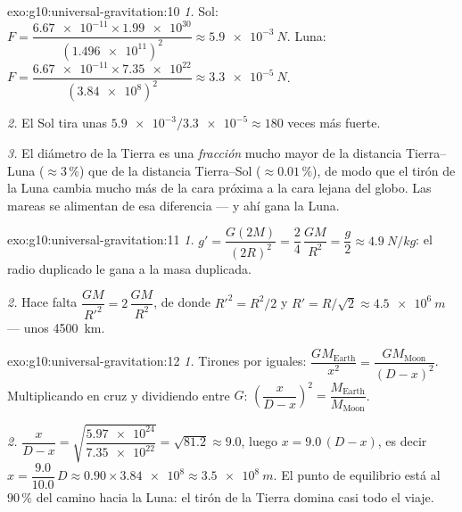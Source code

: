 \begin{solution}{exo:g10:universal-gravitation:10}
\emph{1.} Sol:
$F = \dfrac{\num{6.67e-11} \times \num{1.99e30}}{(\num{1.496e11})^2}
\approx \qty{5.9e-3}{N}$. Luna:
$F = \dfrac{\num{6.67e-11} \times \num{7.35e22}}{(\num{3.84e8})^2}
\approx \qty{3.3e-5}{N}$.

\emph{2.} El Sol tira unas $\num{5.9e-3}/\num{3.3e-5} \approx 180$ veces
más fuerte.

\emph{3.} El diámetro de la Tierra es una \emph{fracción} mucho mayor de
la distancia Tierra--Luna ($\approx 3\,\%$) que de la distancia
Tierra--Sol ($\approx 0.01\,\%$), de modo que el tirón de la Luna cambia
mucho más de la cara próxima a la cara lejana del globo. Las mareas se
alimentan de esa diferencia --- y ahí gana la Luna.
\end{solution}

\begin{solution}{exo:g10:universal-gravitation:11}
\emph{1.} $g' = \dfrac{G (2M)}{(2R)^2} = \dfrac{2}{4}\,\dfrac{GM}{R^2}
= \dfrac{g}{2} \approx \qty{4.9}{N/kg}$: el radio duplicado le gana a la
masa duplicada.

\emph{2.} Hace falta $\dfrac{GM}{R'^2} = 2\,\dfrac{GM}{R^2}$, de donde
$R'^2 = R^2/2$ y $R' = R/\sqrt{2} \approx \qty{4.5e6}{m}$ --- unos
\qty{4500}{km}.
\end{solution}

\begin{solution}{exo:g10:universal-gravitation:12}
\emph{1.} Tirones por  iguales:
$\dfrac{G M_{\text{Earth}}}{x^2} = \dfrac{G M_{\text{Moon}}}{(D-x)^2}$.
Multiplicando en cruz y dividiendo entre $G$:
$\left(\dfrac{x}{D-x}\right)^2 = \dfrac{M_{\text{Earth}}}{M_{\text{Moon}}}$.

\emph{2.} $\dfrac{x}{D-x}
= \sqrt{\dfrac{\num{5.97e24}}{\num{7.35e22}}} = \sqrt{81.2} \approx
9.0$, luego $x = 9.0\,(D - x)$, es decir $x = \dfrac{9.0}{10.0}\,D
\approx 0.90 \times \num{3.84e8} \approx \qty{3.5e8}{m}$. El punto de
equilibrio está al $90\,\%$ del camino hacia la Luna: el tirón de la
Tierra domina casi todo el viaje.
\end{solution}

